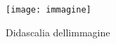 \begin{figure}[H]
    \centering
    \texttt{[image: immagine]}
    \caption{Didascalia dellimmagine}
\end{figure}